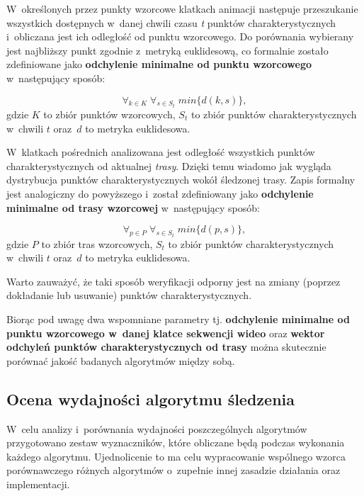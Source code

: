       W~określonych przez punkty wzorcowe klatkach animacji następuje przeszukanie wszystkich dostępnych w~danej chwili czasu \textit{t} punktów charakterystycznych i~obliczana jest ich odległość od punktu wzorcowego. Do porównania wybierany jest najbliższy punkt zgodnie z~metryką euklidesową, co formalnie zostało zdefiniowane jako \textbf{odchylenie minimalne od punktu wzorcowego} w~następujący sposób:

        \begin{equation}
          \forall_{k\in K} \; \forall_{s \in S_{t}} \; min\{ d(k, s) \},
        \end{equation}
      gdzie $K$ to zbiór punktów wzorcowych, $S_{t}$ to zbiór punktów charakterystycznych w~chwili $t$ oraz~$d$ to metryka euklidesowa.

      W~klatkach pośrednich analizowana jest odległość wszystkich punktów charakterystycznych od aktualnej \textit{trasy}. Dzięki temu wiadomo jak wygląda dystrybucja punktów charakterystycznych wokół śledzonej trasy. Zapis formalny jest analogiczny do powyższego i~został zdefiniowany jako \textbf{odchylenie minimalne od trasy wzorcowej} w~następujący sposób:

        \begin{equation}
          \forall_{p\in P} \; \forall_{s \in S_{t}} \; min\{ d(p, s) \},
        \end{equation}
      gdzie $P$ to zbiór tras wzorcowych, $S_{t}$ to zbiór punktów charakterystycznych w~chwili $t$ oraz~$d$ to metryka euklidesowa.

      Warto zauważyć, że taki sposób weryfikacji odporny jest na zmiany (poprzez dokładanie lub usuwanie) punktów charakterystycznych.

      Biorąc pod uwagę dwa wspomniane parametry tj. \textbf{odchylenie minimalne od punktu wzorcowego w~danej klatce sekwencji wideo} oraz \textbf{wektor odchyleń punktów charakterystycznych od trasy} można skutecznie porównać jakość badanych algorytmów między sobą.

    \subsection{Ocena wydajności algorytmu śledzenia}\label{Subsection_Wydajnosc}

      W~celu analizy i~porównania wydajności poszczególnych algorytmów przygotowano zestaw wyznaczników, które obliczane będą podczas wykonania każdego algorytmu. Ujednolicenie to ma celu wypracowanie wspólnego wzorca porównawczego różnych algorytmów o~zupełnie innej zasadzie działania oraz implementacji.

